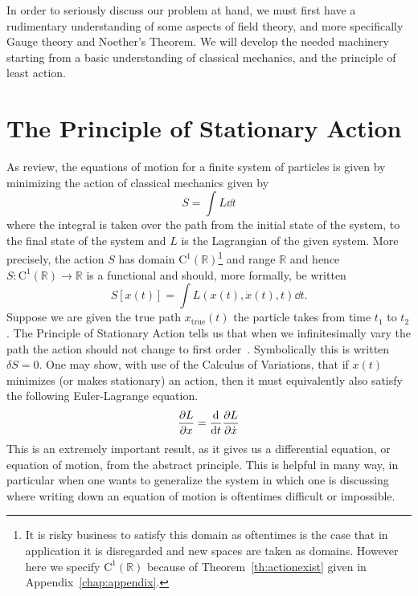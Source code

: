 
In order to seriously discuss our problem at hand, we must first have a
rudimentary understanding of some aspects of field theory, and more specifically
Gauge theory and Noether's Theorem. We will develop the needed machinery
starting from a basic understanding of classical mechanics, and the principle of
least action.

\section{The Principle of Stationary Action}\label{sec:stationary}
As review, the equations of motion for a finite system of particles is given by
minimizing the action of classical mechanics given by
\begin{equation}\label{eq:action}
    S = \int L\dd{t}
\end{equation}
where the integral is taken over the path from the initial state of the system,
to the final state of the system and \(L\) is the Lagrangian of the given
system. More precisely, the action \(S\) has domain
\(\mathrm{C}^1(\mathbb{R})\)\footnote{It is risky business to satisfy this
    domain as oftentimes is the case that in application it is disregarded and new
    spaces are taken as domains. However here we specify
    \(\mathrm{C}^1(\mathbb{R})\) because of Theorem~\ref{th:actionexist} given in
    Appendix~\ref{chap:appendix}.} and range \(\mathbb{R}\) and hence
\(S:\mathrm{C}^1(\mathbb{R})\to \mathbb{R}\) is a functional and should, more
formally, be written
\begin{equation}\label{eq:actionFunc}
    S\left[x(t)\right] = \int L(x(t), \dot{x}(t), t)\dd{t}.
\end{equation}
Suppose we are given the true path \(x_\mathrm{true}(t)\) the particle takes
from time \(t_1\) to \(t_2\). The Principle of Stationary Action tells us that
when we infinitesimally vary the path the action should not change to first
order~\cite{feynman}. Symbolically this is written \(\delta S = 0\). One may
show, with use of the Calculus of Variations, that if \(x(t)\) minimizes (or
makes stationary) an action, then it must equivalently also satisfy the
following Euler-Lagrange equation.
\begin{equation}\label{eq:eulerlag}
    \pdv{L}{x} = \dv{t} \pdv{L}{\dot{x}}
\end{equation}
This is an extremely important result, as it gives us a differential equation,
or equation of motion, from the abstract principle. This is helpful in many way,
in particular when one wants to generalize the system in which one is discussing
where writing down an equation of motion is oftentimes difficult or impossible.

